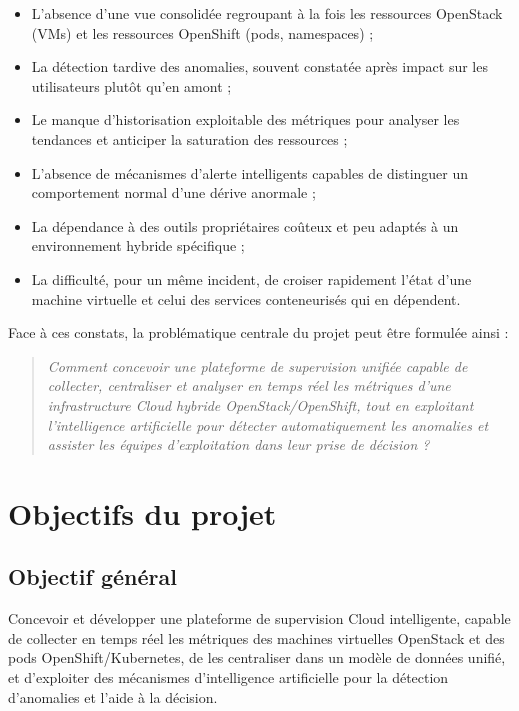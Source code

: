 \documentclass[11pt,a4paper]{report}
\begin{document}
\begin{itemize}[label=\textbullet, leftmargin=1.5cm, labelsep=0.5cm,
                itemsep=0.1em, parsep=0em, topsep=0.2em]
    \item L'absence d'une vue consolidée regroupant à la fois les ressources
    OpenStack (VMs) et les ressources OpenShift (pods, namespaces) ;
    \item La détection tardive des anomalies, souvent constatée après impact
    sur les utilisateurs plutôt qu'en amont ;
    \item Le manque d'historisation exploitable des métriques pour analyser
    les tendances et anticiper la saturation des ressources ;
    \item L'absence de mécanismes d'alerte intelligents capables de
    distinguer un comportement normal d'une dérive anormale ;
    \item La dépendance à des outils propriétaires coûteux et peu adaptés à un
    environnement hybride spécifique ;
    \item La difficulté, pour un même incident, de croiser rapidement l'état
    d'une machine virtuelle et celui des services conteneurisés qui en
    dépendent.
\end{itemize}

Face à ces constats, la problématique centrale du projet peut être formulée
ainsi :

\begin{quote}
\itshape
Comment concevoir une plateforme de supervision unifiée capable de collecter,
centraliser et analyser en temps réel les métriques d'une infrastructure
Cloud hybride OpenStack/OpenShift, tout en exploitant l'intelligence
artificielle pour détecter automatiquement les anomalies et assister les
équipes d'exploitation dans leur prise de décision ?
\end{quote}

\section{Objectifs du projet}

\subsection{Objectif général}

Concevoir et développer une plateforme de supervision Cloud intelligente,
capable de collecter en temps réel les métriques des machines virtuelles
OpenStack et des pods OpenShift/Kubernetes, de les centraliser dans un modèle
de données unifié, et d'exploiter des mécanismes d'intelligence artificielle
pour la détection d'anomalies et l'aide à la décision.
\end{document}
